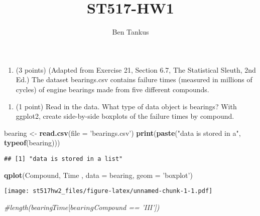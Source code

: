 \documentclass[
]{article}
\title{ST517-HW1}
\author{Ben Tankus}
\date{}
\newenvironment{Shaded}{\begin{snugshade}}{\end{snugshade}}
\newcommand{\CommentTok}[1]{\textcolor[rgb]{0.56,0.35,0.01}{\textit{#1}}}
\newcommand{\DataTypeTok}[1]{\textcolor[rgb]{0.13,0.29,0.53}{#1}}
\newcommand{\KeywordTok}[1]{\textcolor[rgb]{0.13,0.29,0.53}{\textbf{#1}}}
\newcommand{\NormalTok}[1]{#1}
\newcommand{\StringTok}[1]{\textcolor[rgb]{0.31,0.60,0.02}{#1}}
\providecommand{\tightlist}{%
  \setlength{\itemsep}{0pt}\setlength{\parskip}{0pt}}
\begin{document}
\maketitle

\begin{enumerate}
\def\labelenumi{\arabic{enumi}.}
\tightlist
\item
  (3 points) (Adapted from Exercise 21, Section 6.7, The Statistical
  Sleuth, 2nd Ed.) The dataset bearings.csv contains failure times
  (measured in millions of cycles) of engine bearings made from five
  different compounds.
\end{enumerate}

\begin{enumerate}
\def\labelenumi{(\alph{enumi})}
\tightlist
\item
  (1 point) Read in the data. What type of data object is bearings? With
  ggplot2, create side-by-side boxplots of the failure times by
  compound.
\end{enumerate}

\begin{Shaded}
\begin{Highlighting}[]
\NormalTok{bearing <-}\StringTok{ }\KeywordTok{read.csv}\NormalTok{(}\DataTypeTok{file =} \StringTok{'bearings.csv'}\NormalTok{)}
\KeywordTok{print}\NormalTok{(}\KeywordTok{paste}\NormalTok{(}\StringTok{"data is stored in a"}\NormalTok{, }\KeywordTok{typeof}\NormalTok{(bearing)))}
\end{Highlighting}
\end{Shaded}

\begin{verbatim}
## [1] "data is stored in a list"
\end{verbatim}

\begin{Shaded}
\begin{Highlighting}[]
\KeywordTok{qplot}\NormalTok{(Compound, Time , }\DataTypeTok{data =}\NormalTok{ bearing, }\DataTypeTok{geom =} \StringTok{'boxplot'}\NormalTok{)}
\end{Highlighting}
\end{Shaded}

\texttt{[image: st517hw2\_files/figure-latex/unnamed-chunk-1-1.pdf]}

\begin{Shaded}
\begin{Highlighting}[]
\CommentTok{#length(bearing$Time[bearing$Compound == 'III'])}
\end{Highlighting}
\end{Shaded}
\end{document}
